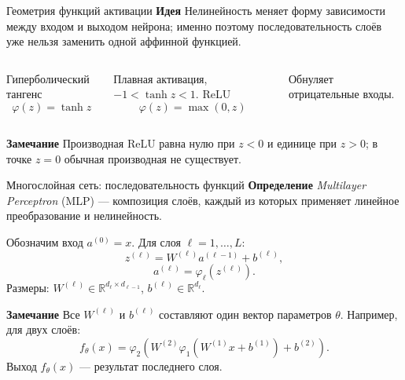 \documentclass[10pt]{beamer}
\newcommand{\dblue}[1]{\textcolor{defblue}{#1}}
\newcommand{\mlBody}{\normalsize}
\newcommand{\mlDefinition}{\textcolor{defblue}{\bfseries Определение}}
\newcommand{\mlRemark}{\textcolor{defblue}{\bfseries Замечание}}
\newcommand{\mlIdea}{\textcolor{defblue}{\bfseries Идея}}
\begin{document}
\begin{frame}{Геометрия функций активации}
\mlBody
\mlIdea\; Нелинейность меняет форму зависимости между входом и выходом нейрона; именно поэтому последовательность слоёв уже нельзя заменить одной аффинной функцией.
\vspace{0.12cm}
\begin{columns}[T,onlytextwidth]
    \centering
    \dblue{Гиперболический тангенс}
    \[
        \varphi(z)=\tanh z
    \]
    \par\smallskip
    Плавная активация, $-1<\tanh z<1$.
    \centering
    \dblue{ReLU}
    \[
        \varphi(z)=\max(0,z)
    \]
    \par\smallskip
    Обнуляет отрицательные входы.
\end{columns}
\mlRemark\; Производная ReLU равна нулю при $z<0$ и единице при $z>0$; в точке $z=0$ обычная производная не существует.
\end{frame}


\begin{frame}{Многослойная сеть: последовательность функций}
\mlBody
\mlDefinition\; \textit{Multilayer Perceptron} (MLP) --- композиция слоёв, каждый из которых применяет линейное преобразование и нелинейность.

Обозначим вход $a^{(0)}=x$. Для слоя $\ell=1,\ldots,L$:
\[
 \boxed{z^{(\ell)}=W^{(\ell)}a^{(\ell-1)}+b^{(\ell)}},
\]
\[
 \boxed{a^{(\ell)}=\varphi_\ell(z^{(\ell)})}.
\]
Размеры: $W^{(\ell)}\in\mathbb R^{d_\ell\times d_{\ell-1}}$,
$b^{(\ell)}\in\mathbb R^{d_\ell}$.

\mlRemark\; Все $W^{(\ell)}$ и $b^{(\ell)}$ составляют один вектор
параметров $\theta$. Например, для двух слоёв:
\[
 f_\theta(x)=\varphi_2\!\left(W^{(2)}
 \varphi_1(W^{(1)}x+b^{(1)})+b^{(2)}\right).
\]
Выход $f_\theta(x)$ --- результат последнего слоя.
\end{frame}
\end{document}
